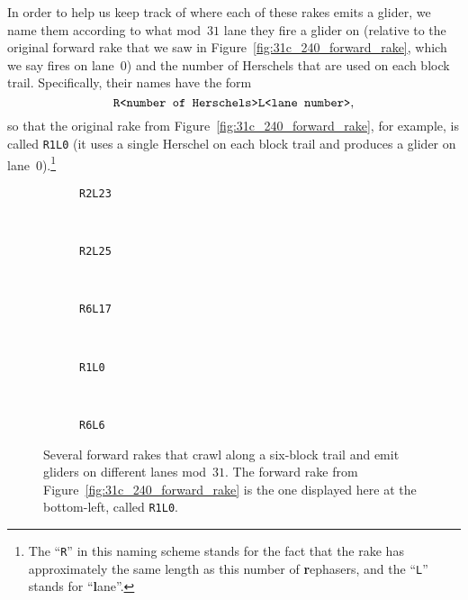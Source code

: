 In order to help us keep track of where each of these rakes emits a glider, we name them according to what mod~$31$ lane they fire a glider on (relative to the original forward rake that we saw in Figure~\ref{fig:31c_240_forward_rake}, which we say fires on lane~$0$) and the number of Herschels that are used on each block trail. Specifically, their names have the form
\[
	\text{\texttt{R<number of Herschels>L<lane number>}},
\]
so that the original rake from Figure~\ref{fig:31c_240_forward_rake}, for example, is called \texttt{R1L0} (it uses a single Herschel on each block trail and produces a glider on lane~0).\footnote{The ``\texttt{R}'' in this naming scheme stands for the fact that the rake has approximately the same length as this number of \textbf{r}ephasers, and the ``\texttt{L}'' stands for ``\textbf{l}ane''.}

\begin{figure}[!htb]
	\centering
	\begin{minipage}{0.3\textwidth}
		\begin{subfigure}{\linewidth}
			\centering
			\caption{\texttt{R2L23}}\label{fig:R2L23}
		\end{subfigure} \\[0.1cm] \begin{subfigure}{\linewidth}
			\centering
			\caption{\texttt{R2L25}}\label{fig:R2L25}
		\end{subfigure}
	\end{minipage} \ \ \ \begin{subfigure}{0.66\textwidth}
		\centering
		\caption{\texttt{R6L17}}\label{fig:R6L17}
	\end{subfigure} \\[0.1cm]
	\begin{subfigure}{0.3\textwidth}
		\centering
		\caption{\texttt{R1L0}}\label{fig:R1L0}
	\end{subfigure} \ \ \ \begin{subfigure}{0.66\textwidth}
		\centering
		\caption{\texttt{R6L6}}\label{fig:R6L6}
	\end{subfigure}
	\caption{Several forward rakes that crawl along a six-block trail and emit gliders on different lanes mod~$31$. The forward rake from Figure~\ref{fig:31c_240_forward_rake} is the one displayed here at the bottom-left, called \texttt{R1L0}.}\label{fig:31c_240_forerakes}
\end{figure}

